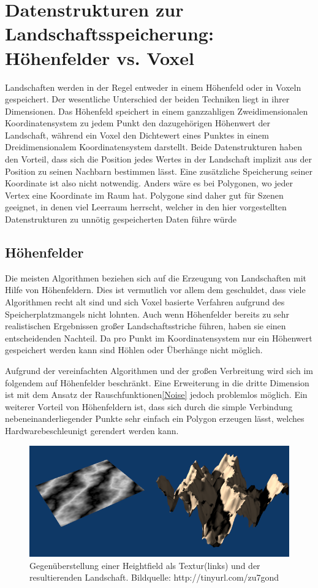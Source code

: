 \section{Datenstrukturen zur Landschaftsspeicherung: Höhenfelder vs. Voxel}
Landschaften werden in der Regel entweder in einem Höhenfeld oder in Voxeln gespeichert.
Der wesentliche Unterschied der beiden Techniken liegt in ihrer Dimensionen. Das Höhenfeld speichert in einem ganzzahligen Zweidimensionalen Koordinatensystem zu jedem Punkt den dazugehörigen Höhenwert der Landschaft, während ein Voxel den Dichtewert eines Punktes in einem Dreidimensionalem Koordinatensystem darstellt. Beide Datenstrukturen haben den Vorteil, dass sich die Position jedes Wertes in der Landschaft implizit aus der Position zu seinen Nachbarn bestimmen lässt. Eine zusätzliche Speicherung seiner Koordinate ist also nicht notwendig. Anders wäre es bei Polygonen, wo jeder Vertex eine Koordinate im Raum hat. Polygone sind daher gut für Szenen geeignet, in denen viel Leerraum herrscht, welcher in den hier vorgestellten Datenstrukturen zu unnötig gespeicherten Daten führe würde

\subsection{Höhenfelder}
Die meisten Algorithmen beziehen sich auf die Erzeugung von Landschaften mit Hilfe von Höhenfeldern. Dies ist vermutlich vor allem dem geschuldet, dass viele Algorithmen recht alt sind und sich Voxel basierte Verfahren aufgrund des Speicherplatzmangels nicht lohnten.
Auch wenn Höhenfelder bereits zu sehr realistischen Ergebnissen großer Landschaftsstriche führen, haben sie einen entscheidenden Nachteil. Da pro Punkt im Koordinatensystem nur ein Höhenwert gespeichert werden kann sind Höhlen oder Überhänge nicht möglich.

Aufgrund der vereinfachten Algorithmen und der großen Verbreitung wird sich im folgendem auf Höhenfelder beschränkt. Eine Erweiterung in die dritte Dimension ist mit dem Ansatz der Rauschfunktionen\ref{Noise} jedoch problemlos möglich.
Ein weiterer Vorteil von Höhenfeldern ist, dass sich durch die simple Verbindung nebeneinanderliegender Punkte sehr einfach ein Polygon erzeugen lässt, welches Hardwarebeschleunigt gerendert werden kann.

\begin{figure}
	\centering
	\includegraphics[width=\textwidth]{images/heightfield_rendered.png}
	\caption{Gegenüberstellung einer Heightfield als Textur(links) und der resultierenden Landschaft. Bildquelle: http://tinyurl.com/zu7gond}\label{img.heightfield}
\end{figure}

